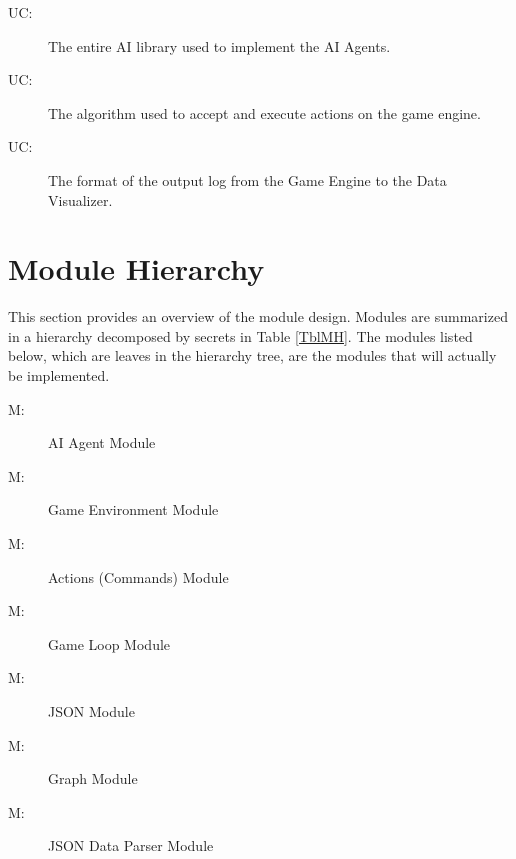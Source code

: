 \documentclass[12pt, titlepage]{article}
\newcounter{ucnum}
\newcommand{\uctheucnum}{UC\theucnum}
\newcounter{mnum}
\newcommand{\mthemnum}{M\themnum}
\begin{document}
\begin{description}
\item[ \uctheucnum \label{ucAILib}:] The entire AI library used to implement the AI Agents.
\item[ \uctheucnum \label{ucGE}:] The algorithm used to accept and execute actions on the game engine.
\item[ \uctheucnum \label{ucDV}:] The format of the output log from the Game Engine to the Data Visualizer.
\end{description}
\section{Module Hierarchy} \label{SecMH}

This section provides an overview of the module design. Modules are summarized
in a hierarchy decomposed by secrets in Table \ref{TblMH}. The modules listed
below, which are leaves in the hierarchy tree, are the modules that will
actually be implemented.

\begin{description}
\item [ \mthemnum \label{mAI}:] AI Agent Module
\item [ \mthemnum \label{mGE}:] Game Environment Module
\item [ \mthemnum \label{mAct}:] Actions (Commands) Module
\item [ \mthemnum \label{mGL}:] Game Loop Module
\item [ \mthemnum \label{mJSON}:] JSON Module
\item [ \mthemnum \label{mGr}:] Graph Module
\item [ \mthemnum \label{mJSONDP}:] JSON Data Parser Module
\end{description}
\end{document}
